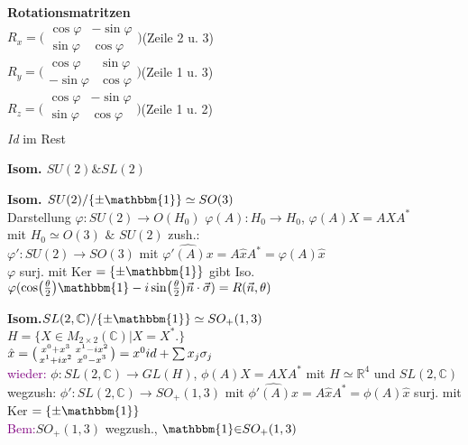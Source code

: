 \documentclass[8pt, a4paper, landscape]{extarticle}
\newcommand{\tit}[1]{\textbf{#1} \\}
\newcommand{\sh}[1]{\small\textbf{#1}}
\newcommand{\pu}[1]{\textcolor{purple}{#1}}
\begin{document}
\begin{multicols*}{5}
\begin{ibox}
    \tit{Rotationsmatritzen}
    $R_{x}=\big(\begin{smallmatrix}
        \cos \varphi & -\sin \varphi \\
        \sin \varphi & \cos \varphi 
    \end{smallmatrix}\big)$(Zeile 2 u. 3)\\
    $R_{y}=\big(\begin{smallmatrix}
        \cos \varphi & \sin \varphi\\
        -\sin \varphi & \cos \varphi 
    \end{smallmatrix}\big)$(Zeile 1 u. 3)\\
    $R_{z} = \big(\begin{smallmatrix}
        \cos \varphi & -\sin \varphi\\
        \sin \varphi & \cos \varphi\\
    \end{smallmatrix}\big)$(Zeile 1 u. 2)\\
    \textit{Id} im Rest
\end{ibox}

\begin{cbox}
    \sh{Isom. $SU(2)\&SL(2)$}
\end{cbox}

\begin{ibox}
   \tit{Isom. $SU(2)/\{\pm \mathbbm{1}\}\simeq SO(3)$} 
   Darstellung $\varphi:SU(2)\rightarrow O(H_0)$
   $\varphi(A):H_0 \rightarrow H_0$, 
   $\varphi(A)X=AXA^*$\\
   mit $H_0 \simeq O(3)$ $\&$ $SU(2)$ zush.: \\ $\varphi':SU(2)\rightarrow SO(3)$ mit  
   $\widehat{\varphi'(A)x}=A\hat{x}A^*=\varphi(A)\hat{x}$\\
   $\varphi$ surj. mit Ker $=\{\pm\mathbbm{1}\}$ gibt Iso.
   \\
   $\varphi(\cos(\frac{\theta}{2})\mathbbm{1}-i\sin(\frac{\theta}{2})\vec n\cdot\vec \sigma) = R(\vec n, \theta)$
\end{ibox}

\begin{ibox}
    \tit{Isom.$SL(2,\mathbb{C})/\{\pm \mathbbm{1}\}\simeq SO_+(1,3)$}
    $H=\{X\in M_{2\times2}(\mathbb{C})|X = X^*.\}$\\
    $\hat{x}=\big(\begin{smallmatrix}
    x^0+x^3 & x^1-ix^2\\
    x^1+ix^2 & x^0-x^3
    \end{smallmatrix}\big)=x^0id + \small\sum x_j\sigma_j$\\
    \pu{wieder:} $\phi: SL(2,\mathbb{C})\rightarrow GL(H)$, $\phi(A)X=AXA^*$ mit $H\simeq \mathbb{R}^4$ und $SL(2,\mathbb{C})$ wegzush: $\phi':SL(2,\mathbb{C})\rightarrow SO_+(1,3)$ mit $\widehat{\phi'(A)x}=A\hat{x}A^*=\phi(A)\hat{x}$ surj. mit Ker $=\{\pm\mathbbm{1}\}$\\
    \pu{Bem:}$SO_+(1,3)$ wegzush., $\mathbbm{1}\negthickspace\in\negthickspace SO_+(1,3)$
\end{ibox}







\end{multicols*}
\end{document}
